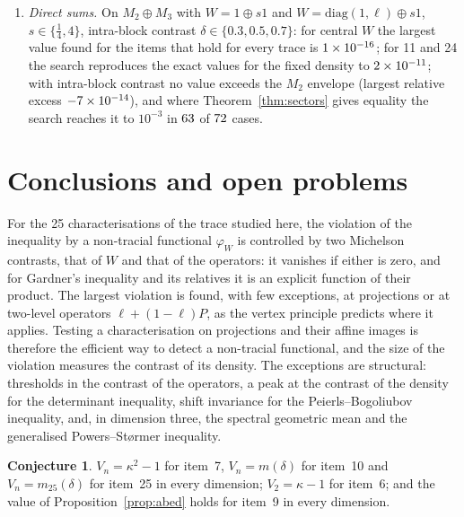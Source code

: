 \documentclass[11pt]{article}
\theoremstyle{plain}
\theoremstyle{definition}
\newtheorem{conjecture}[theorem]{Conjecture}
\theoremstyle{remark}
\begin{document}
\begin{enumerate}
item~6 for $\delta\le0.2$. Item~25 is resolved for $\delta\ge\TCWmonFirst$; the search reaches $m_{25}$ to $10^{-3}$ for
$\delta\ge\TCWmonReach$ and does not exceed it.
\item[(vi)] \emph{Direct sums.} On $M_2\oplus M_3$ with $W=1\oplus s1$ and $W=\mathrm{diag}(1,\ell)\oplus s1$, $s\in\{\frac14,4\}$,
intra-block contrast $\delta\in\{0.3,0.5,0.7\}$: for central $W$ the largest value found for the items that hold for every
trace is $1\times10^{-16}$; for 11 and 24 the search reproduces the exact values for the fixed density to $2\times10^{-11}$;
with intra-block contrast no value exceeds the $M_2$ envelope (largest relative excess $-7\times10^{-14}$), and where
Theorem~\ref{thm:sectors} gives equality the search reaches it to $10^{-3}$ in $63$ of $72$ cases.
\end{enumerate}

\section{Conclusions and open problems}\label{sec:open}

For the 25 characterisations of the trace studied here, the violation of the inequality by a non-tracial functional
$\varphi_W$ is controlled by two Michelson contrasts, that of $W$ and that of the operators: it vanishes if either is
zero, and for Gardner's inequality and its relatives it is an explicit function of their product. The largest violation
is found, with few exceptions, at projections or at two-level operators $\ell+(1-\ell)P$, as the vertex principle predicts
where it applies. Testing a characterisation on projections and their affine images is therefore the efficient way to
detect a non-tracial functional, and the size of the violation measures the contrast of its density. The exceptions are
structural: thresholds in the contrast of the operators, a peak at the contrast of the density for the determinant
inequality, shift invariance for the Peierls--Bogoliubov inequality, and, in dimension three, the spectral geometric
mean and the generalised Powers--St{\o}rmer inequality.


\begin{conjecture}
$V_n=\kappa^2-1$ for item~7, $V_n=m(\delta)$ for item~10 and $V_n=m_{25}(\delta)$ for item~25 in every dimension;
$V_2=\kappa-1$ for item~6; and the value of Proposition~\ref{prop:abed} holds for item~9 in every dimension.
\end{conjecture}
\end{document}
